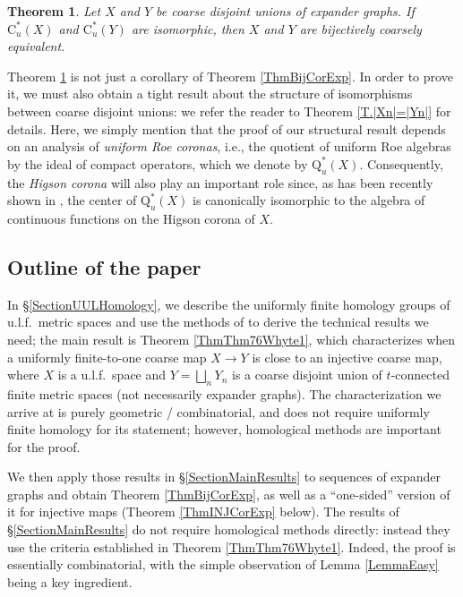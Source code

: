 \documentclass[11pt]{amsart}
\newcommand{\cstu}{\mathrm{C}^*_u}
\newcommand{\roeq}{\mathrm{Q}^*_u}
\numberwithin{equation}{section}
\newtheorem{theorem}{Theorem}[section]
\theoremstyle{definition}
\theoremstyle{remark}
\numberwithin{equation}{section}
\begin{document}
\begin{theorem}\label{ThmIsoURAImpliesBijCoarseEquivExp}
 Let $X$ and $Y$ be coarse disjoint unions of expander graphs. If $\cstu(X)$ and $\cstu(Y)$ are isomorphic, then $X$ and $Y$ are bijectively coarsely equivalent. 
\end{theorem}

Theorem \ref{ThmIsoURAImpliesBijCoarseEquivExp} is not just a corollary of Theorem \ref{ThmBijCorExp}. In order to prove it, we must also obtain a tight result about the structure of isomorphisms between coarse disjoint unions: we refer the reader to Theorem \ref{T.|Xn|=|Yn|} for details. Here, we simply mention that the proof of our structural result  depends on an analysis of \emph{uniform Roe coronas}, i.e., the quotient of uniform Roe algebras by the ideal of compact operators, which we denote by $\roeq(X)$. Consequently,   the \emph{Higson corona} will also play an important role  since, as has been recently shown in \cite[Proposition 3.6]{BaudierBragaFarahVignatiWillett2023},  the center of $\roeq(X)$ is canonically isomorphic to the algebra of continuous functions on the Higson corona of $X$.
 
 
 \subsection*{Outline of the paper}
 
 In \S\ref{SectionUULHomology}, we  describe the uniformly finite homology groups of u.l.f.\ metric spaces and use the methods of \cite{Whyte1999Duke} to derive the  technical results we need; the main result is Theorem \ref{ThmThm76Whyte1}, which characterizes when  a uniformly finite-to-one coarse map $X\to Y$ is close to an injective coarse map, where $X$ is a u.l.f.\ space and $Y=\bigsqcup_n Y_n$ is a coarse disjoint union of $t$-connected finite metric spaces (not necessarily expander graphs).  The characterization we arrive at is purely geometric / combinatorial, and does not require uniformly finite homology for its statement; however, homological methods are important for the proof.   
 
 We then apply those results in \S\ref{SectionMainResults} to sequences of expander graphs and obtain Theorem \ref{ThmBijCorExp}, as well as a ``one-sided''  version of it for injective maps (Theorem \ref{ThmINJCorExp} below).  The results of \S\ref{SectionMainResults} do not require homological methods directly: instead they use the criteria established in Theorem \ref{ThmThm76Whyte1}.  Indeed, the proof is essentially combinatorial, with the simple observation of Lemma  \ref{LemmaEasy} being a key ingredient.  
 
\end{document}
